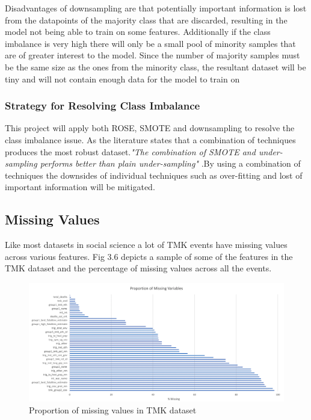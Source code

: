 Disadvantages of downsampling are that potentially important information is lost from the datapoints of the majority class that are discarded, resulting in the model not being able to train on some features. Additionally if the class imbalance is very high there will only be a small pool of minority samples that are of greater interest to the model. Since the number of majority samples must be the same size as the ones from the minority class, the resultant dataset will be tiny and will not contain enough data for the model to train on


\subsubsection{Strategy for Resolving Class Imbalance}
This project will apply both ROSE, SMOTE and downsampling to resolve the class imbalance issue. As the literature states that a combination of techniques produces the most robust dataset.\emph{"The combination of SMOTE and under-sampling performs better than plain under-sampling"} \cite{Lunardo}.By using a combination of techniques the downsides of individual techniques such as over-fitting and lost of important information will be mitigated.

\subsection{Missing Values}
Like most datasets in social science a lot of TMK events have missing values across various features. Fig 3.6 depicts a sample of some of the features in the TMK dataset and the percentage of missing values across all the events. 

\begin{figure}[h]
\centering
\includegraphics{proportionOfMissingvalues.png}
\caption{Proportion of missing values in TMK dataset}
\end{figure}


